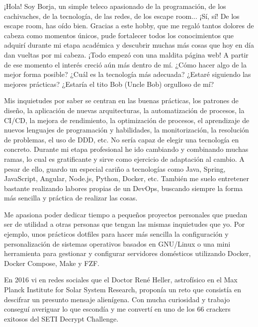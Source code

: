 
\begin{cvparagraph}
¡Hola! Soy Borja, un simple teleco apasionado de la programación, de los cachivaches, de la tecnología, de las redes, de los escape room... ¡Sí, sí! De los escape room, has oído bien. Gracias a este hobby, que me regaló tantos dolores de cabeza como momentos únicos, pude fortalecer todos los conocimientos que adquirí durante mi etapa académica y descubrir muchas más cosas que hoy en día dan vueltas por mi cabeza. ¡Todo empezó con una maldita página web! A partir de ese momento el interés creció aún más dentro de mí. ¿Cómo hacer algo de la mejor forma posible? ¿Cuál es la tecnología más adecuada? ¿Estaré siguiendo las mejores prácticas? ¿Estaría el tito Bob (Uncle Bob) orgulloso de mí?

Mis inquietudes por saber se centran en las buenas prácticas, los patrones de diseño, la aplicación de nuevas arquitecturas, la automatización de procesos, la CI/CD, la mejora de rendimiento, la optimización de procesos, el aprendizaje de nuevos lenguajes de programación y habilidades, la monitorización, la resolución de problemas, el uso de DDD, etc. No sería capaz de elegir una tecnología en concreto. Durante mi etapa profesional he ido cambiando y combinando muchas ramas, lo cual es gratificante y sirve como ejercicio de adaptación al cambio. A pesar de ello, guardo un especial cariño a tecnologías como Java, Spring, JavaScript, Angular, Node.js, Python, Docker, etc. También me suelo entretener bastante realizando labores propias de un DevOps, buscando siempre la forma más sencilla y práctica de realizar las cosas.

Me apasiona poder dedicar tiempo a pequeños proyectos personales que puedan ser de utilidad a otras personas que tengan las mismas inquietudes que yo. Por ejemplo, unos prácticos dotfiles para hacer más sencilla la configuración y personalización de sistemas operativos basados en GNU/Linux o una mini herramienta para gestionar y configurar servidores domésticos utilizando Docker, Docker Compose, Make y FZF.

En 2016 vi en redes sociales que el Doctor René Heller, astrofísico en el Max Planck Institute for Solar System Research, proponía un reto que consistía en descifrar un presunto mensaje alienígena. Con mucha curiosidad y trabajo conseguí averiguar lo que escondía y me convertí en uno de los 66 crackers exitosos del SETI Decrypt Challenge.
\end{cvparagraph}
